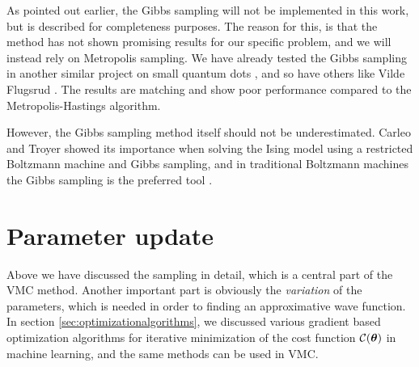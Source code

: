 As pointed out earlier, the Gibbs sampling will not be implemented in this work, but is described for completeness purposes. The reason for this, is that the method has not shown promising results for our specific problem, and we will instead rely on Metropolis sampling. We have already tested the Gibbs sampling in another similar project on small quantum dots \cite{nordhagen_computational_2018}, and so have others like Vilde Flugsrud \cite{flugsrud_vilde_moe_solving_nodate}. The results are matching and show poor performance compared to the Metropolis-Hastings algorithm.

However, the Gibbs sampling method itself should not be underestimated. Carleo and Troyer showed its importance when solving the Ising model using a restricted Boltzmann machine and Gibbs sampling, and in traditional Boltzmann machines the Gibbs sampling is the preferred tool \cite{carleo_solving_2017}.

\section{Parameter update} \label{sec:parameterupdate}
Above we have discussed the sampling in detail, which is a central part of the VMC method. Another important part is obviously the \textit{variation} of the parameters, which is needed in order to finding an approximative wave function. In section \ref{sec:optimizationalgorithms}, we discussed various gradient based optimization algorithms for iterative minimization of the cost function $\mathcal{C}(\boldsymbol{{\theta}})$ in machine learning, and the same methods can be used in VMC.

